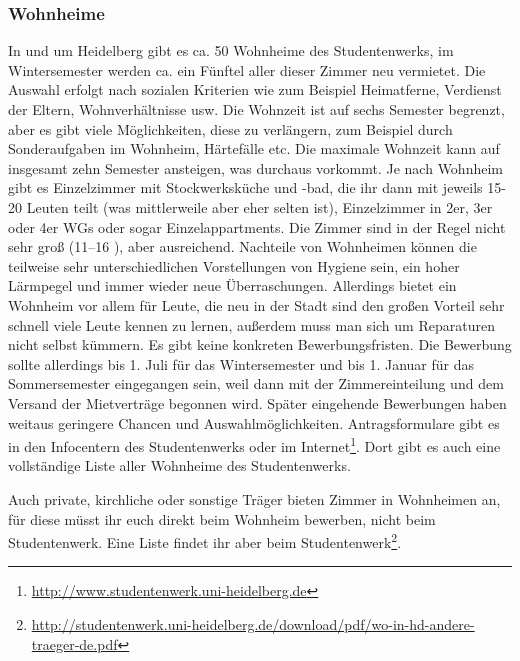 \subsubsection{Wohnheime}
In und um Heidelberg gibt es ca. 50 Wohnheime des Studentenwerks, im Wintersemester
werden ca. ein Fünftel aller dieser Zimmer neu vermietet. Die Auswahl erfolgt nach
sozialen Kriterien wie zum Beispiel Heimatferne, Verdienst der Eltern,
Wohnverhältnisse usw. Die Wohnzeit ist auf sechs Semester begrenzt, aber es gibt
viele Möglichkeiten, diese zu verlängern, zum Beispiel durch Sonderaufgaben im
Wohnheim, Härtefälle etc. Die maximale Wohnzeit kann auf insgesamt zehn Semester ansteigen, was
durchaus vorkommt. Je nach Wohnheim gibt es Einzelzimmer mit Stockwerksküche und
-bad, die ihr dann mit jeweils 15-20 Leuten teilt (was mittlerweile aber eher selten
ist), Einzelzimmer in 2er, 3er oder 4er WGs oder sogar Einzelappartments. Die Zimmer
sind in der Regel nicht sehr groß (11--16 \squaren\metre), aber ausreichend. Nachteile von
Wohnheimen können die teilweise sehr unterschiedlichen Vorstellungen von Hygiene
sein, ein hoher Lärmpegel und immer wieder neue Überraschungen. Allerdings bietet
ein Wohnheim vor allem für Leute, die neu in der Stadt sind den großen Vorteil sehr
schnell viele Leute kennen zu lernen, außerdem muss man sich um Reparaturen nicht
selbst kümmern. Es gibt keine konkreten Bewerbungsfristen. Die Bewerbung sollte
allerdings bis 1. Juli für das Wintersemester und bis 1. Januar für das
Sommersemester eingegangen sein, weil dann mit der Zimmereinteilung und dem Versand
der Mietverträge begonnen wird. Später eingehende Bewerbungen haben weitaus
geringere Chancen und Auswahlmöglichkeiten. Antragsformulare gibt es in den
Infocentern des Studentenwerks oder im Internet\footnote{\url{http://www.studentenwerk.uni-heidelberg.de}}.
Dort gibt es auch eine vollständige Liste aller Wohnheime des Studentenwerks.

Auch private, kirchliche oder sonstige Träger bieten Zimmer in Wohnheimen an, für
diese müsst ihr euch direkt beim Wohnheim bewerben, nicht beim Studentenwerk. Eine
Liste findet ihr aber beim Studentenwerk\footnote{\url{http://studentenwerk.uni-heidelberg.de/download/pdf/wo-in-hd-andere-traeger-de.pdf}}.

